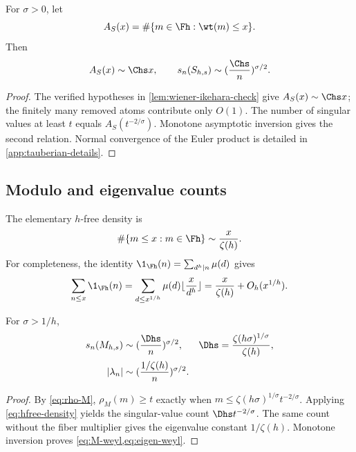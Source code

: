 \begin{proposition}
\label{prop:S-weyl}
For $\sigma>0$, let
\[
  A_S(x)=\#\{m\in\Fh:\wt(m)\le x\}.
\]
Then
\begin{equation}
  A_S(x)\sim\Chs x,
  \qquad
  s_n(S_{h,s})\sim(\frac{\Chs}{n})^{\sigma/2}.
  \label{eq:S-weyl}
\end{equation}
\end{proposition}

\begin{proof}
The verified hypotheses in \cref{lem:wiener-ikehara-check} give
$A_S(x)\sim\Chs x$; the finitely many removed atoms contribute only
$O(1)$.  The number of singular values
at least $t$ equals $A_S(t^{-2/\sigma})$.  Monotone asymptotic inversion
gives the second relation.  Normal convergence of the Euler product is
detailed in \cref{app:tauberian-details}.
\end{proof}

\subsection{Modulo and eigenvalue counts}

The elementary $h$-free density is
\begin{equation}
  \#\{m\le x:m\in\Fh\}\sim\frac{x}{\zeta(h)}.
  \label{eq:hfree-density}
\end{equation}
For completeness, the identity
$\1_{\Fh}(n)=\sum_{d^h\mid n}\mu(d)$ gives
\[
  \sum_{n\le x}\1_{\Fh}(n)
  =\sum_{d\le x^{1/h}}\mu(d)\lfloor\frac{x}{d^h}\rfloor
  =\frac{x}{\zeta(h)}+O_h(x^{1/h}).
\]

\begin{proposition}
\label{prop:M-weyl}
For $\sigma>1/h$,
\begin{align}
  s_n(M_{h,s})
    &\sim(\frac{\Dhs}{n})^{\sigma/2},
      &\Dhs&=\frac{\zeta(h\sigma)^{1/\sigma}}{\zeta(h)},
      \label{eq:M-weyl}\\
  |\lambda_n|
    &\sim(\frac{1/\zeta(h)}{n})^{\sigma/2}.
      \label{eq:eigen-weyl}
\end{align}
\end{proposition}

\begin{proof}
By \cref{eq:rho-M}, $\rho_M(m)\ge t$ exactly when
$m\le\zeta(h\sigma)^{1/\sigma}t^{-2/\sigma}$.  Applying
\cref{eq:hfree-density} yields the singular-value count
$\Dhs t^{-2/\sigma}$.  The same count without the fiber multiplier gives
the eigenvalue constant $1/\zeta(h)$.  Monotone inversion proves
\cref{eq:M-weyl,eq:eigen-weyl}.
\end{proof}

